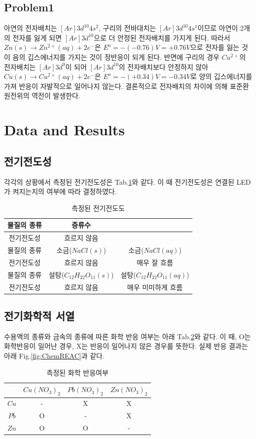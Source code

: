 \documentclass[%
 reprint,
 amsmath,amssymb,
 aps,
]{revtex4-2}
\begin{document}
\subsection{\label{sec:level2}Problem1}
아연의 전자배치는 $[Ar]3d^{10}4s^{2}$, 구리의 전바대치는 $[Ar]3d^{10}4s^{1}$이므로 아연이 2개의 전자를 잃게 되면 $[Ar]3d^{10}$으로 더 안정된 전자배치를 가지게 된다. 따라서 $Zn(s) \rightarrow Zn^{2+}(aq) + 2e^{-}$은 $E^{o} = -(-0.76)V = +0.76V$으로 전자를 잃는 것이 음의 깁스에너지를 가지는 것이 정반응이 되게 된다. 반면에 구리의 경우 $Cu^{2+}$의 전자배치는 $[Ar]3d^{9}$이 되어 $[Ar]3d^{10}$의 전자배치보다 안정하지 않아 $Cu(s) \rightarrow Cu^{2+}(aq) + 2e^{-}$은 $E^{o} = -(+0.34)V = -0.34V$로 양의 깁스에너지를 가져 반응이 자발적으로 일어나지 않는다. 결론적으로 전자배치의 차이에 의해 표준환원전위의 역전이 발생한다.

\section{\label{sec:level1}Data and Results}
\subsection{\label{sec:level2}전기전도성}
각각의 상황에서 측정된 전기전도성은 Tab.\ref{tab:elecond}와 같다. 이 때 전기전도성은 연결된 LED가 켜지는지의 여부에 따라 결정하였다.
\begin{table}[]
\begin{tabular}{c|c|c} \hline \hline
 물질의 종류 & 증류수 \\ \hline
전기전도성 & 흐르지 않음\\ \hline \hline
 물질의 종류 & 소금($NaCl(s)$) & 소금($NaCl(aq)$) \\ \hline
전기전도성 & 흐르지 않음 & 매우 잘 흐름 \\ \hline \hline
 물질의 종류 & 설탕($C_{12}H_{22}O_{11}(s)$) & 설탕($C_{12}H_{22}O_{11}(aq)$)\\ \hline
전기전도성 & 흐르지 않음 & 매우 미미하게 흐름 \\ \hline \hline 
\end{tabular}
\caption{\label{tab:elecond}측정된 전기전도도}
\end{table}

\subsection{\label{sec:level2}전기화학적 서열}
수용액의 종류와 금속의 종류에 따른 화학 반응 여부는 아래 Tab.\ref{tab:chemreaction}와 같다. 이 때, O는 화학반응이 일어난 경우, X는 반응이 일어나지 않은 경우를 뜻한다. 실제 반응 결과는 아래 Fig.\ref{fig:ChemREAC}과 같다.
\begin{table}[]
\begin{tabular}{c|c|c|c} \hline \hline
 & $Cu(NO_{3})_{2}$ & $Pb(NO_{3})_{2}$ & $Zn(NO_{3})_{2}$ \\ \hline
$Cu$ & - & X & X\\ \hline
$Pb$ & O & - & X\\ \hline
$Zn$ & O & O & - \\  \hline \hline 
\end{tabular}
\caption{\label{tab:chemreaction}측정된 화학 반응여부}
\end{table}
\end{document}
